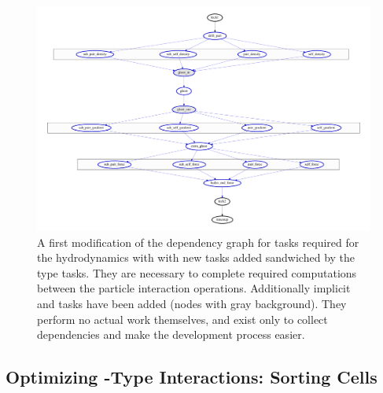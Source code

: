 \begin{figure}
\centering
\includegraphics[width=\linewidth]{figures/Meshless/tasks_hydro_first_order.pdf}%
\caption{
A first modification of the dependency graph for tasks required for the hydrodynamics with \swift
with new  tasks added sandwiched by the  type tasks. They are
necessary to complete required computations between the particle interaction operations.
Additionally implicit  and  tasks have been added (nodes with
gray background). They perform no actual work themselves, and exist only to collect dependencies and
make the development process easier.
}
\label{fig:dependency-graph-first-order}
\end{figure}




\subsection{Optimizing -Type Interactions: Sorting Cells}

